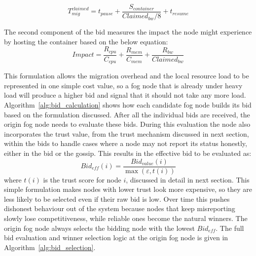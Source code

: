 \documentclass{article}
\begin{document}
\begin{equation}
T^{claimed}_{mig}=t_{pause}+\frac{S_{container}}{Claimed_{bw}/8}+t_{resume}
\label{eq:claimed_mig}
\end{equation}

The second component of the bid measures the impact the node might experience by hosting the container based on the below equation: 
\begin{equation}
Impact=\frac{R_{cpu}}{C_{cpu}}+\frac{R_{mem}}{C_{mem}}+\frac{R_{bw}}{Claimed_{bw}}
\label{eq:impact}
\end{equation}

This formulation allows the migration overhead and the local resource load to be represented in one simple cost value, so a fog node that is already under heavy load will produce a higher bid and signal that it should not take any more load. Algorithm~\ref{alg:bid_calculation} shows how each candidate fog node builds its bid based on the formulation discussed.
After all the individual bids are received, the origin fog node needs to evaluate these bids. During this evaluation the node also incorporates the trust value, from the trust mechanism discussed in next section, within the bids to handle cases where a node may not report its status honestly, either in the bid or the gossip. This results in the effective bid to be evaluated as:
 \begin{equation}
 Bid_{eff}(i)=\frac{Bid_{value}(i)}{\max(\varepsilon,t(i))}
 \label{eq:effective_bid}
 \end{equation}
where $t(i)$ is the trust score for node $i$, discussed in detail in next section. This simple formulation makes nodes with lower trust look more expensive, so they are less likely to be selected even if their raw bid is low. Over time this pushes dishonest behaviour out of the system because nodes that keep misreporting slowly lose competitiveness, while reliable ones become the natural winners. The origin fog node always selects the bidding node with the lowest $Bid_{eff}$. The full bid evaluation and winner selection logic at the origin fog node is given in Algorithm~\ref{alg:bid_selection}.
\end{document}
